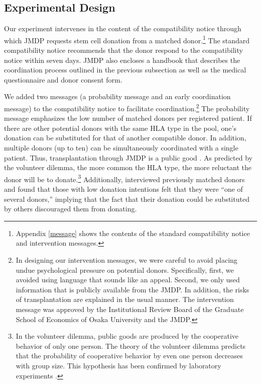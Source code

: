 \documentclass[12pt, a4paper]{article}
\begin{document}
\hypertarget{design}{%
\subsection{Experimental Design}\label{design}}

Our experiment intervenes in the content of the compatibility notice through which JMDP requests stem cell donation from a matched donor.\footnote{Appendix \ref{message} shows the contents of the standard compatibility notice and intervention messages.} The standard compatibility notice recommends that the donor respond to the compatibility notice within seven days. JMDP also encloses a handbook that describes the coordination process outlined in the previous subsection as well as the medical questionnaire and donor consent form.

We added two messages (a probability message and an early coordination message) to the compatibility notice to facilitate coordination.\footnote{In designing our intervention messages, we were careful to avoid placing undue psychological pressure on potential donors. Specifically, first, we avoided using language that sounds like an appeal. Second, we only used information that is publicly available from the JMDP. In addition, the risks of transplantation are explained in the usual manner. The intervention message was approved by the Institutional Review Board of the Graduate School of Economics of Osaka University and the JMDP.} The probability message emphasizes the low number of matched donors per registered patient. If there are other potential donors with the same HLA type in the pool, one's donation can be substituted for that of another compatible donor. In addition, multiple donors (up to ten) can be simultaneously coordinated with a single patient. Thus, transplantation through JMDP is a public good \citep{Bergstrom2009}. As predicted by the volunteer dilemma, the more common the HLA type, the more reluctant the donor will be to donate.\footnote{In the volunteer dilemma, public goods are produced by the cooperative behavior of only one person. The theory of the volunteer dilemma predicts that the probability of cooperative behavior by even one person decreases with group size. This hypothesis has been confirmed by laboratory experiments \citep{Diekmann1985, Diekmann1986, Franzen1999, Davis2017}.} Additionally, \citet{Kurosawa2022} interviewed previously matched donors and found that those with low donation intentions felt that they were ``one of several donors,'' implying that the fact that their donation could be substituted by others discouraged them from donating.
\end{document}
